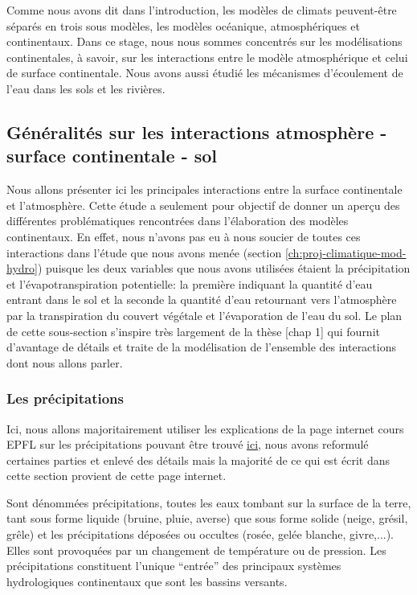 \documentclass[a4paper,11pt]{article}
\numberwithin{equation}{section}
\begin{document}
Comme nous avons dit dans l'introduction, les modèles de climats peuvent-être séparés en trois sous modèles, les modèles océanique, atmosphériques et continentaux. Dans ce stage, nous nous sommes concentrés sur les modélisations continentales, à savoir, sur les interactions entre le modèle atmosphérique et celui de surface continentale. Nous avons aussi étudié les mécanismes d'écoulement de l'eau dans les sols et les rivières. 

\subsection{Généralités sur les interactions atmosphère - surface continentale - sol}
\label{ch:generalite interaction atmosphere-surface continentale-sol}
Nous allons présenter ici les principales interactions entre la surface continentale et l'atmosphère. Cette étude a seulement pour objectif de donner un aperçu des différentes problématiques rencontrées dans l'élaboration des modèles continentaux. En effet, nous n'avons pas eu à nous soucier de toutes ces interactions dans l'étude que nous avons menée (section \ref{ch:proj-climatique-mod-hydro}) puisque les deux variables que nous avons utilisées étaient la précipitation et l'évapotranspiration potentielle: la première indiquant la quantité d'eau entrant dans le sol et la seconde la quantité d'eau retournant vers l'atmosphère par la transpiration du couvert végétale et l'évaporation de l'eau du sol. Le plan de cette sous-section s'inspire très largement de la thèse \cite{maquin2016developpement}[chap 1] qui fournit d'avantage de détails et traite de la modélisation de l'ensemble des interactions dont nous allons parler.

\subsubsection{Les précipitations}
\label{ch:precipitations}

Ici, nous allons majoritairement utiliser les explications de la page internet cours EPFL sur les précipitations pouvant être trouvé \href{https://echo2.epfl.ch/e-drologie/chapitres/chapitre3/chapitre3.html}{\underline{ici}}, nous avons reformulé certaines parties et enlevé des détails mais la majorité de ce qui est écrit dans cette section provient de cette page internet.
 
\vspace{0.7cm}
 
Sont dénommées précipitations, toutes les eaux tombant sur la surface de la terre, tant sous forme liquide (bruine, pluie, averse) que sous forme solide (neige, grésil, grêle) et les précipitations déposées ou occultes (rosée, gelée blanche, givre,...). Elles sont provoquées par un changement de température ou de pression. Les précipitations constituent l'unique ``entrée'' des principaux systèmes hydrologiques continentaux que sont les bassins versants. 
\end{document}
